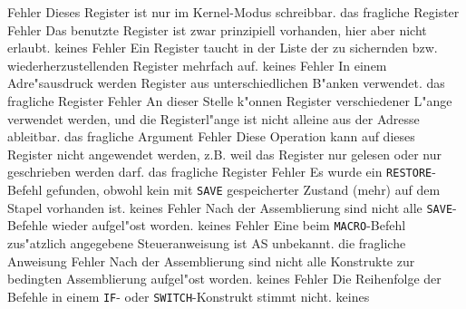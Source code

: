 \documentclass[12pt,a4paper,twoside]{report}
\newcommand{\tty}[1]{{\tt #1}}
\newcommand{\asname}{AS}
\begin{document}
\begin{description}
               {Fehler}
               {Dieses Register ist nur im Kernel-Modus schreibbar.}
               {das fragliche Register}
               {Fehler}
               {Das benutzte Register ist zwar prinzipiell
                vorhanden, hier aber nicht erlaubt.}
               {keines}
               {Fehler}
               {Ein Register taucht in der Liste der zu sichernden bzw.
                wiederherzustellenden Register mehrfach auf.}
               {keines}
               {Fehler}
               {In einem Adre"sausdruck werden Register aus unterschiedlichen
                B"anken verwendet.}
               {das fragliche Register}
               {Fehler}
               {An dieser Stelle k"onnen Register verschiedener L"ange verwendet werden,
                und die Registerl"ange ist nicht alleine aus der Adresse ableitbar.}
               {das fragliche Argument}
               {Fehler}
               {Diese Operation kann auf dieses Register nicht angewendet werden, z.B.
                weil das Register nur gelesen oder nur geschrieben werden darf.}
               {das fragliche Register}
               {Fehler}
               {Es wurde ein \tty{RESTORE}-Befehl gefunden, obwohl
                kein mit \tty{SAVE} gespeicherter Zustand (mehr) auf dem Stapel
                vorhanden ist.}
               {keines}
               {Fehler}
               {Nach der Assemblierung sind nicht alle
                \tty{SAVE}-Befehle wieder aufgel"ost worden.}
               {keines}
               {Fehler}
               {Eine beim \tty{MACRO}-Befehl zus"atzlich angegebene
                Steueranweisung ist \asname{} unbekannt.}
               {die fragliche Anweisung}
               {Fehler}
               {Nach der Assemblierung sind nicht alle
                Konstrukte zur bedingten Assemblierung aufgel"ost
                worden.}
               {keines}
               {Fehler}
               {Die Reihenfolge der Befehle in einem \tty{IF}-
	        oder \tty{SWITCH}-Konstrukt stimmt nicht.}
               {keines}

\end{description}
\end{document}
